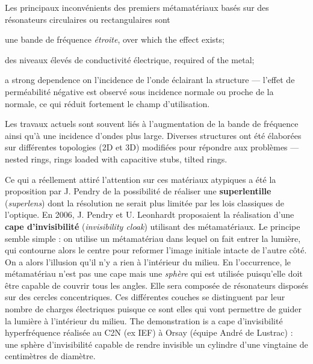 \begin{conclusion}
  Les principaux inconvénients des premiers métamatériaux basés sur des
  résonateurs circulaires ou rectangulaires sont
  \begin{subpart}
    \item une bande de fréquence \emph{étroite}, over which the effect exists;
    \item des niveaux élevés de conductivité électrique, required of the metal;
    \item a strong dependence on l'incidence de l'onde éclairant la structure
      --- l'effet de perméabilité négative est observé sous incidence normale ou
      proche de la normale, ce qui réduit fortement le champ d'utilisation.
  \end{subpart}
  Les travaux actuels sont souvent liés à l'augmentation de la bande de
  fréquence ainsi qu'à une incidence d'ondes plus large. Diverses structures ont
  été élaborées sur différentes topologies (2D et 3D) modifiées pour répondre
  aux problèmes --- nested rings, rings loaded with capacitive stubs, tilted
  rings.
\end{conclusion}

\begin{remark}
  Ce qui a réellement attiré l'attention sur ces matériaux atypiques a été la
  proposition par J. Pendry de la possibilité de réaliser une
  \textbf{superlentille} (\textit{superlens}) dont la résolution ne serait plus
  limitée par les lois classiques de l'optique. En 2006, J. Pendry et
  U. Leonhardt proposaient la réalisation d'une \textbf{cape d'invisibilité}
  (\textit{invisibility cloak}) utilisant des métamatériaux. Le principe semble
  simple : on utilise un métamatériau dans lequel on fait entrer la lumière, qui
  contourne alors le centre pour reformer l'image initiale intacte de l'autre
  côté. On a alors l'illusion qu'il n'y a rien à l'intérieur du milieu. En
  l'occurrence, le métamatériau n'est pas une cape mais une \emph{sphère} qui
  est utilisée puisqu'elle doit être capable de couvrir tous les angles. Elle
  sera composée de résonateurs disposés sur des cercles concentriques. Ces
  différentes couches se distinguent par leur nombre de charges électriques
  puisque ce sont elles qui vont permettre de guider la lumière à l'intérieur du
  milieu. The demonstration is a cape d'invisibilité hyperfréquence réalisée au
  C2N (ex IEF) à Orsay (équipe André de Lustrac) : une sphère d'invisibilité
  capable de rendre invisible un cylindre d'une vingtaine de centimètres de
  diamètre.
\end{remark}

